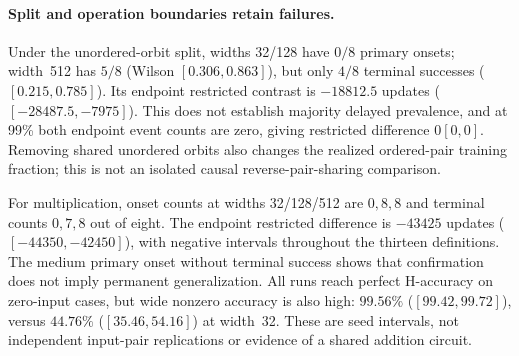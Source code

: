 \paragraph{Split and operation boundaries retain failures.}
Under the unordered-orbit split, widths 32/128 have $0/8$ primary onsets; width~512 has $5/8$ (Wilson $[0.306,0.863]$), but only $4/8$ terminal successes ($[0.215,0.785]$). Its endpoint restricted contrast is $-18812.5$ updates ($[-28487.5,-7975]$). This does not establish majority delayed prevalence, and at 99\% both endpoint event counts are zero, giving restricted difference $0[0,0]$. Removing shared unordered orbits also changes the realized ordered-pair training fraction; this is not an isolated causal reverse-pair-sharing comparison.

For multiplication, onset counts at widths 32/128/512 are $0,8,8$ and terminal counts $0,7,8$ out of eight. The endpoint restricted difference is $-43425$ updates ($[-44350,-42450]$), with negative intervals throughout the thirteen definitions. The medium primary onset without terminal success shows that confirmation does not imply permanent generalization. All runs reach perfect H-accuracy on zero-input cases, but wide nonzero accuracy is also high: $99.56\%$ ($[99.42,99.72]$), versus $44.76\%$ ($[35.46,54.16]$) at width~32. These are seed intervals, not independent input-pair replications or evidence of a shared addition circuit.
